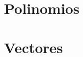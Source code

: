 \documentclass[12pt]{article}
\begin{document}
\tableofcontents









\section{Polinomios}


\section{Vectores}

\end{document}
